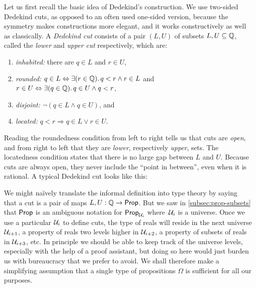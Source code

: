%
Let us first recall the basic idea of Dedekind's construction. We use two-sided Dedekind
cuts, as opposed to an often used one-sided version, because the symmetry makes
constructions more elegant, and it works constructively as well as classically.
%
A \emph{Dedekind cut} consists of a pair $(L, U)$ of subsets $L, U \subseteq \mathbb{Q}$, called the
\emph{lower} and \emph{upper cut} respectively, which are:
% 
\begin{enumerate}
\item \emph{inhabited:} there are $q \in L$ and $r \in U$,
\item \emph{rounded:} $q \in L \Leftrightarrow \exis {r \in \Q} q < r \land r \in L$
  and $r \in U \Leftrightarrow \exis {q \in \Q} q \in U \land q < r$,
\item \emph{disjoint:} $\lnot (q \in L \land q \in U)$, and
\item \emph{located:} $q < r \Rightarrow q \in L \lor r \in U$.
\end{enumerate}
%
Reading the roundedness condition from left to right tells us that cuts are \emph{open},
%
and from right to left that they are \emph{lower}, respectively \emph{upper}, sets. The
locatedness condition states that there is no large gap between $L$ and $U$. Because cuts
are always open, they never include the ``point in between'', even when it is rational. A
typical Dedekind cut looks like this:
%
\begin{center}
\end{center}
%
We might na\"ively translate the informal definition into type theory by saying that a cut
is a pair of maps $L, U : \mathbb{Q} \to \mathsf{Prop}$. But we saw in \autoref{subsec:prop-subsets} that
$\mathsf{Prop}$ is an ambiguous notation for $\mathsf{Prop}_{\mathcal{U}_i}$ where~$\mathcal{U}_i$ is a universe. Once we
use a particular $\mathcal{U}_i$ to define cuts, the type of reals will reside in the next
universe $\mathcal{U}_{i+1}$, a property of reals two levels higher in $\mathcal{U}_{i+2}$, a property of
subsets of reals in $\mathcal{U}_{i+3}$, etc. In principle we should be able to keep track of the
universe levels, especially with the help of a proof assistant, but doing so here would
just burden us with bureaucracy that we prefer to avoid. We shall therefore make a
simplifying assumption that a single type of propositions $\Omega$ is sufficient for all
our purposes.

